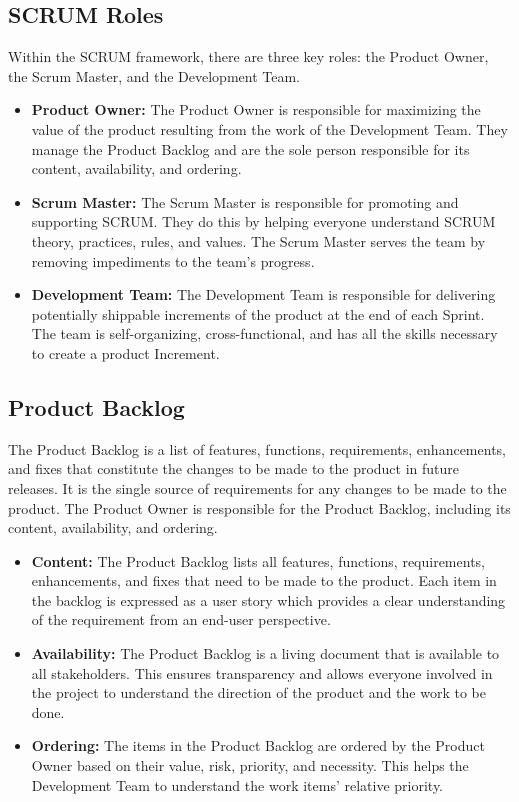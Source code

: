 \subsection{SCRUM Roles}
Within the SCRUM framework, there are three key roles: the Product Owner, the Scrum Master, and the Development Team.

\vspace{10pt}

\begin{itemize}
\item \textbf{Product Owner:} The Product Owner is responsible for maximizing the value of the product resulting from the work of the Development Team. They manage the Product Backlog and are the sole person responsible for its content, availability, and ordering.

\item \textbf{Scrum Master:} The Scrum Master is responsible for promoting and supporting SCRUM. They do this by helping everyone understand SCRUM theory, practices, rules, and values. The Scrum Master serves the team by removing impediments to the team's progress.

\item \textbf{Development Team:} The Development Team is responsible for delivering potentially shippable increments of the product at the end of each Sprint. The team is self-organizing, cross-functional, and has all the skills necessary to create a product Increment.
\end{itemize}

\subsection{Product Backlog}
The Product Backlog is a list of features, functions, requirements, enhancements, and fixes that constitute the changes to be made to the product in future releases. It is the single source of requirements for any changes to be made to the product. The Product Owner is responsible for the Product Backlog, including its content, availability, and ordering.

\vspace{10pt}

\begin{itemize}
\item \textbf{Content:} The Product Backlog lists all features, functions, requirements, enhancements, and fixes that need to be made to the product. Each item in the backlog is expressed as a user story which provides a clear understanding of the requirement from an end-user perspective.
\item \textbf{Availability:} The Product Backlog is a living document that is available to all stakeholders. This ensures transparency and allows everyone involved in the project to understand the direction of the product and the work to be done.
\item \textbf{Ordering:} The items in the Product Backlog are ordered by the Product Owner based on their value, risk, priority, and necessity. This helps the Development Team to understand the work items' relative priority.
\end{itemize}

